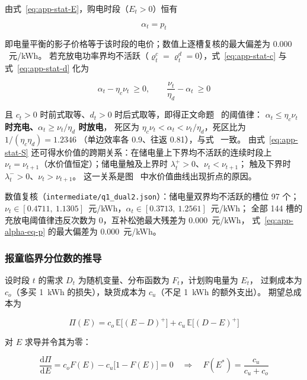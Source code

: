 由式~\eqref{eq:app-stat-E}，购电时段（$E_t>0$）恒有

\begin{equation}
  \alpha_t=p_t
  \label{eq:app-alpha-eq-p}
\end{equation}

即电量平衡的影子价格等于该时段的电价；数值上逐槽复核的最大偏差为 $0.000$~元/kWh。
若充放电功率界均不活跃（$\varrho^{c}_t=\varrho^{d}_t=0$），式~\eqref{eq:app-stat-c} 与
式~\eqref{eq:app-stat-d} 化为

\begin{equation}
  \alpha_t-\eta_c\nu_t\ \ge 0,\qquad
  \frac{\nu_t}{\eta_d}-\alpha_t\ \ge 0
  \label{eq:app-threshold-raw}
\end{equation}

且 $c_t>0$ 时前式取等、$d_t>0$ 时后式取等，即得正文命题~ 的阈值律：
\textbf{$\alpha_t\le\eta_c\nu_t$ 时充电、$\alpha_t\ge\nu_t/\eta_d$ 时放电}，
死区为 $\eta_c\nu_t<\alpha_t<\nu_t/\eta_d$，死区比为 $1/(\eta_c\eta_d)=1.2346$
（单边效率各 0.9、往返 0.81），与式~ 一致。
由式~\eqref{eq:app-stat-S} 还可得水价值的跨期关系：在储电量上下界均不活跃的连续时段上
$\nu_t=\nu_{t+1}$（水价值恒定）；储电量触及上界时 $\lambda^{+}_t>0$、$\nu_t<\nu_{t+1}$；
触及下界时 $\lambda^{-}_t>0$、$\nu_t>\nu_{t+1}$。
这一关系是图~ 中水价值曲线出现折点的原因。

数值复核（\texttt{intermediate/q1\_dual2.json}）：储电量双界均不活跃的槽位 97 个；
$\nu_t\in[0.4711,\ 1.1305]$~元/kWh，$\alpha_t\in[0.3713,\ 1.2561]$~元/kWh；
全部 144 槽的充放电阈值律违反次数为 $0$，互补松弛最大残差为 $0.000$~元/kWh，
式~\eqref{eq:app-alpha-eq-p} 的最大偏差为 $0.000$~元/kWh。

\subsubsection{报童临界分位数的推导}

设时段 $t$ 的需求 $D_t$ 为随机变量、分布函数为 $F_t$，计划购电量为 $E_t$，
过剩成本为 $c_o$（多买 1~kWh 的损失），缺货成本为 $c_u$（不足 1~kWh 的额外支出）。
期望总成本为

\begin{equation}
  \Pi(E)=c_o\,\mathbb E\bigl[(E-D)^{+}\bigr]+c_u\,\mathbb E\bigl[(D-E)^{+}\bigr]
  \label{eq:app-nv-cost}
\end{equation}

对 $E$ 求导并令其为零：

\begin{equation}
  \frac{\mathrm d\Pi}{\mathrm dE}
  =c_oF(E)-c_u\bigl[1-F(E)\bigr]=0
  \quad\Longrightarrow\quad
  F(E^{*})=\frac{c_u}{c_u+c_o}
  \label{eq:app-nv-foc}
\end{equation}

